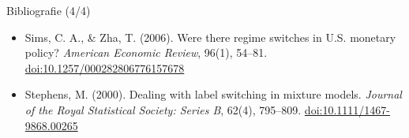 \begin{frame}{Bibliografie (4/4)}
\begin{itemize}
    \item Sims, C. A., \& Zha, T. (2006). Were there regime switches in U.S. monetary policy? \textit{American Economic Review}, 96(1), 54--81. \href{https://doi.org/10.1257/000282806776157678}{doi:10.1257/000282806776157678}
    \item Stephens, M. (2000). Dealing with label switching in mixture models. \textit{Journal of the Royal Statistical Society: Series B}, 62(4), 795--809. \href{https://doi.org/10.1111/1467-9868.00265}{doi:10.1111/1467-9868.00265}
\end{itemize}
\end{frame}



